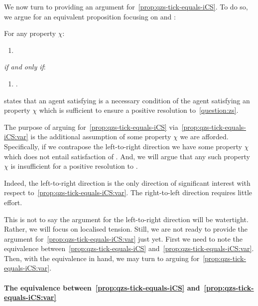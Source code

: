 \begin{note}
  We now turn to providing an argument for~\autoref{prop:qzs-tick-equals-iCS}.
  To do so, we argue for an equivalent proposition focusing on \qzs{} and \Zs{}:

  \begin{proposition}
    \label{prop:qzs-tick-equals-iCS:var}
    For any property \(\chi\):
    \begin{enumerate}[label=\Alph*.]
    \item
      \label{squish:A}
    \end{enumerate}
    \emph{if and only if}:
    \begin{enumerate}[label=\Alph*.,resume]
    \item
      \label{squish:B}
      .
    \end{enumerate}
  \end{proposition}

   states that an agent satisfying \iZs{} is a necessary condition of the agent satisfying an property \(\chi\) which is sufficient to ensure a positive resolution to~\autoref{question:zs}.

  The purpose of arguing for~\autoref{prop:qzs-tick-equals-iCS} via~\autoref{prop:qzs-tick-equals-iCS:var} is the additional assumption of some property \(\chi\) we are afforded.
  Specifically, if we contrapose the left-to-right direction we have some property \(\chi\) which does not entail satisfaction of \iZs{}.
  And, we will argue that any such property \(\chi\) is insufficient for a positive resolution to \qzs{}.

  Indeed, the left-to-right direction is the only direction of significant interest with respect to~\autoref{prop:qzs-tick-equals-iCS:var}.
  The right-to-left direction requires little effort.

  This is not to say the argument for the left-to-right direction will be watertight.
  Rather, we will focus on localised tension.
  Still, we are not ready to provide the argument for~\autoref{prop:qzs-tick-equals-iCS:var} just yet.
  First we need to note the equivalence between~\autoref{prop:qzs-tick-equals-iCS} and~\autoref{prop:qzs-tick-equals-iCS:var}.
  Then, with the equivalence in hand, we may turn to arguing for~\autoref{prop:qzs-tick-equals-iCS:var}.
\end{note}

\paragraph*{The equivalence between~\autoref{prop:qzs-tick-equals-iCS} and~\autoref{prop:qzs-tick-equals-iCS:var}}


